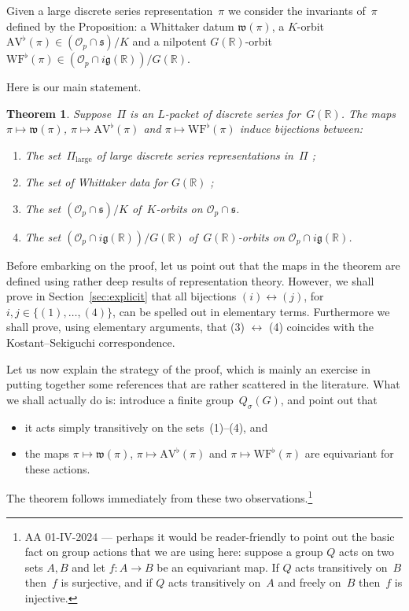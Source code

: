 \documentclass[10pt,leqno]{article}
\newtheorem{theorem}[equation]{Theorem}
\renewcommand{\O}{\mathcal O}
\newcommand{\R}{\mathbb R}
\newcommand{\g}{\mathfrak g}
\newcommand{\s}{\mathfrak s}
\newcommand{\AV}{\mathrm{AV}}
\newcommand{\WF}{\mathrm{WF}}
\newcommand{\Op}{\O_p}
\begin{document}
Given a large discrete series representation~$\pi$ we consider the invariants of~$\pi$ defined by the Proposition: a Whittaker datum  $\mathfrak{w}(\pi)$, a $K$-orbit $\AV^\flat(\pi) \in (\mathcal{O}_p \cap \mathfrak{s})/K$  and a nilpotent $G(\R)$-orbit $\WF^\flat(\pi) \in (\mathcal{O}_p \cap  i \g(\R))/G(\R)$. 

Here is our main statement.

\begin{theorem} \label{th:main} Suppose~$\Pi$ is an $L$-packet of discrete series for~$G(\R)$. 
The maps $\pi \mapsto \mathfrak{w}(\pi)$, $\pi \mapsto \AV^\flat(\pi)$ and $\pi\mapsto \WF^\flat(\pi)$ induce bijections between:
\begin{enumerate}
\item[(1)] The set~$\Pi_{\mathrm{large}}$ of large discrete series representations in~$\Pi$ ;
\item[(2)] The set of Whittaker data for $G(\R)$ ;
\item[(3)] The set $(\Op \cap \s)/K$ of~$K$-orbits on $\mathcal{O}_p \cap \s$.
\item[(4)] The set $(\Op \cap i\g(\R))/G(\R)$ of~$G(\R)$-orbits on $\mathcal{O}_p \cap  i \g(\R)$.
\end{enumerate}
\end{theorem}

Before embarking on the proof, let us point out that the maps in the theorem are defined using rather deep results of representation theory. However, we shall prove in Section~\ref{sec:explicit} that all bijections $(i) \leftrightarrow (j)$, for $i,j \in \{(1), \dots, (4)\}$, can be spelled out in elementary terms. Furthermore we shall prove, using elementary arguments, that (3) $\leftrightarrow$ (4) coincides with the Kostant--Sekiguchi correspondence.  



Let us now explain the strategy of the proof, which is mainly an exercise in putting together some references that are rather scattered in the literature. What we shall actually do is: introduce a finite group~$Q_\sigma(G)$, and point out that 
\begin{itemize}
\item[(i)] it acts simply transitively on the sets~(1)--(4), and 
\item[(ii)] the maps $\pi \mapsto \mathfrak{w}(\pi)$, $\pi \mapsto \AV^\flat(\pi)$ and $\pi\mapsto \WF^\flat(\pi)$  are equivariant for these actions.
\end{itemize}
The theorem follows immediately from these two observations.\footnote{AA 01-IV-2024 --- perhaps it would be reader-friendly to point out the basic fact on group actions that we are using here: suppose a group $Q$ acts on two sets $A, B$ and let $f\colon A \to B$ be an equivariant map. If $Q$ acts transitively on~$B$  then~$f$ is surjective, and if $Q$ acts transitively on~$A$ and freely on~$B$ then~$f$ is injective.  }
\end{document}
